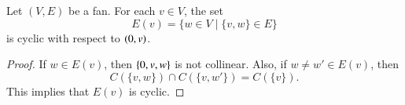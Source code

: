 


\begin{lemma}  Let $(V,E)$ be a fan.
For each $v\in V$, the set
        $$
        E(v) = \{w\in V\mid \{v,w\}\in E\}
        $$
        is cyclic with respect to $(0,v)$.
\end{lemma}

\begin{proof}  If $w\in E(v)$, then $\{0,v,w\}$ is not collinear.
Also, if $w\ne w'\in E(v)$, then
$$
C(\{v,w\})\cap C(\{v,w'\}) = C(\{v\}).
$$
This implies that $E(v)$ is cyclic.
\end{proof}

